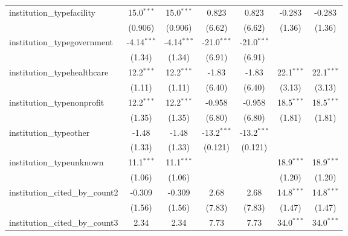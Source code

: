 \begin{tabular}{lcccccc}
   institution\_typefacility             & 15.0$^{***}$  & 15.0$^{***}$  & 0.823         & 0.823         & -0.283        & -0.283\\   
                                         & (0.906)       & (0.906)       & (6.62)        & (6.62)        & (1.36)        & (1.36)\\   
   institution\_typegovernment           & -4.14$^{***}$ & -4.14$^{***}$ & -21.0$^{***}$ & -21.0$^{***}$ &               &   \\   
                                         & (1.34)        & (1.34)        & (6.91)        & (6.91)        &               &   \\   
   institution\_typehealthcare           & 12.2$^{***}$  & 12.2$^{***}$  & -1.83         & -1.83         & 22.1$^{***}$  & 22.1$^{***}$\\   
                                         & (1.11)        & (1.11)        & (6.40)        & (6.40)        & (3.13)        & (3.13)\\   
   institution\_typenonprofit            & 12.2$^{***}$  & 12.2$^{***}$  & -0.958        & -0.958        & 18.5$^{***}$  & 18.5$^{***}$\\   
                                         & (1.35)        & (1.35)        & (6.80)        & (6.80)        & (1.81)        & (1.81)\\   
   institution\_typeother                & -1.48         & -1.48         & -13.2$^{***}$ & -13.2$^{***}$ &               &   \\   
                                         & (1.33)        & (1.33)        & (0.121)       & (0.121)       &               &   \\   
   institution\_typeunknown              & 11.1$^{***}$  & 11.1$^{***}$  &               &               & 18.9$^{***}$  & 18.9$^{***}$\\   
                                         & (1.06)        & (1.06)        &               &               & (1.20)        & (1.20)\\   
   institution\_cited\_by\_count2        & -0.309        & -0.309        & 2.68          & 2.68          & 14.8$^{***}$  & 14.8$^{***}$\\   
                                         & (1.56)        & (1.56)        & (7.83)        & (7.83)        & (1.47)        & (1.47)\\   
   institution\_cited\_by\_count3        & 2.34          & 2.34          & 7.73          & 7.73          & 34.0$^{***}$  & 34.0$^{***}$\\   

\end{tabular}

